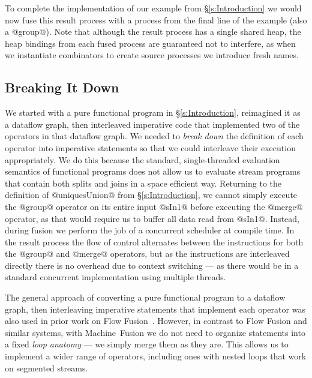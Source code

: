 To complete the implementation of our example from \S\ref{s:Introduction} we would now fuse this result process with a process from the final line of the example (also a @group@).
Note that although the result process has a single shared heap, the heap bindings from each fused process are guaranteed not to interfere, as when we instantiate combinators to create source processes we introduce fresh names. 


\subsection{Breaking It Down}
We started with a pure functional program in \S\ref{s:Introduction}, reimagined it as a dataflow graph, then interleaved imperative code that implemented two of the operators in that dataflow graph. We needed to \emph{break down} the definition of each operator into imperative statements so that we could interleave their execution appropriately. We do this because the standard, single-threaded evaluation semantics of functional programs does not allow us to evaluate stream programs that contain both splits and joins in a space efficient way. Returning to the definition of @uniquesUnion@ from \S\ref{s:Introduction}, we cannot simply execute the @group@ operator on its entire input @sIn1@ before executing the @merge@ operator, as that would require us to buffer all data read from @sIn1@. Instead, during fusion we perform the job of a concurrent scheduler at compile time. In the result process the flow of control alternates between the instructions for both the @group@ and @merge@ operators, but as the instructions are interleaved directly there is no overhead due to context switching --- as there would be in a standard concurrent implementation using multiple threads.

The general approach of converting a pure functional program to a dataflow graph, then interleaving imperative statements that implement each operator was also used in prior work on Flow Fusion~\cite{lippmeier2013data}. However, in contrast to Flow Fusion and similar systems, with \mbox{Machine Fusion} we do not need to organize statements into a fixed \emph{loop anatomy} --- we simply merge them as they are. This allows us to implement a wider range of operators, including ones with nested loops that work on segmented streams.

